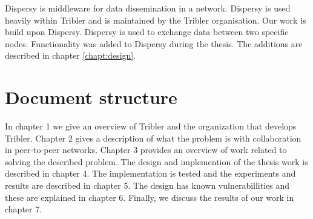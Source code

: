 Dispersy is middleware for data dissemination in a network.
Dispersy is used heavily within Tribler and is maintained by the Tribler organisation.
Our work is build upon Dispersy.
Dispersy is used to exchange data between two specific nodes\cite{zeilemaker-dispersy}.
Functionality was added to Dispersy during the thesis.
The additions are described in chapter \ref{chapt:design}.

\section{Document structure}
In chapter 1 we give an overview of Tribler and the organization that develops Tribler.
Chapter 2 gives a description of what the problem is with collaboration in peer-to-peer networks.
Chapter 3 provides an overview of work related to solving the described problem.
The design and implemention of the thesis work is described in chapter 4.
The implementation is tested and the experiments and results are described in chapter 5.
The design has known vulnerabillities and these are explained in chapter 6.
Finally, we discuss the results of our work in chapter 7.
